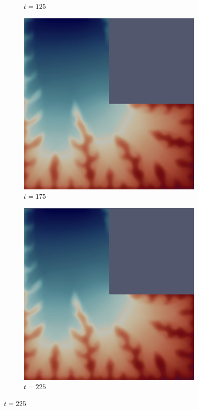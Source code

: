 \begin{figure}[H]
\begin{subfigure}{.4\textwidth}
        \caption{$t = 125$}
    \end{subfigure}
    \begin{subfigure}{.4\textwidth}
        \includegraphics[width=\textwidth]{imgs/LShape_Solution/seventh.png}
        \caption{$t = 175$}
    \end{subfigure}
    \begin{subfigure}{.4\textwidth}
        \includegraphics[width=\textwidth]{imgs/LShape_Solution/eighth.png}
        \caption{$t = 225$}
    \end{subfigure}
\end{figure}

